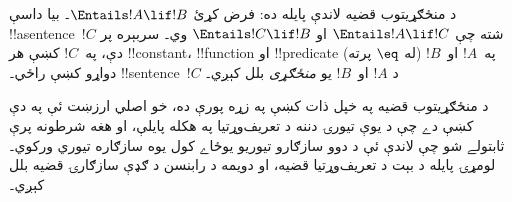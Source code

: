 \documentclass[../../../include/open-logic-section]{subfiles}
\begin{document}


د منځګړيتوب قضيه لاندې پايله ده: فرض کړئ
$\Entails !A \lif !B$۔ بيا داسې !!a{sentence}~$!C$ شته چې
$\Entails !A \lif !C$ او $\Entails !C \lif !B$ وي۔ سربېره پر دې،
په~$!C$ کښې هر !!{constant}، !!{function} او !!{predicate} (له
$\eq$ پرته) په~$!A$ او~$!B$ دواړو کښې راځي۔ !!{sentence}~$!C$ د
$!A$ او~$!B$ يو \emph{منځګړی} بلل کېږي۔

د منځګړيتوب قضيه په خپل ذات کښې په زړه پورې ده، خو اصلي ارزښت ئې
په دې کښې دے چې د يوې تيورۍ دننه د تعريف‌وړتيا په هکله پايلې، او
هغه شرطونه پرې ثابتولے شو چې لاندې ئې د دوو سازګارو تيوريو يوځاے
کول يوه سازګاره تيوري ورکوي۔ لومړۍ پايله د بېت د تعريف‌وړتيا قضيه،
او دويمه د رابنسن د ګډې سازګارۍ قضيه بلل کېږي۔
\end{document}
